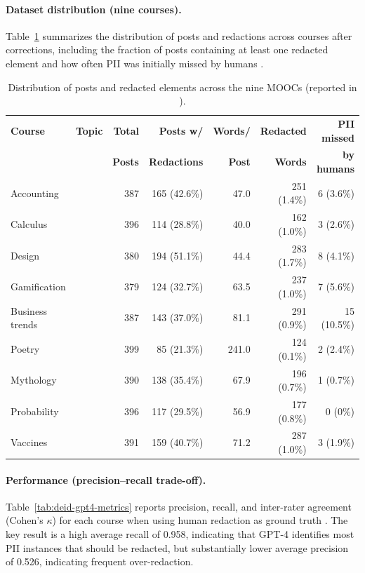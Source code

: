 \paragraph{Dataset distribution (nine courses).}
Table~\ref{tab:deid-gpt4-dist} summarizes the distribution of posts and redactions across courses
after corrections, including the fraction of posts containing at least one redacted element and how often
PII was initially missed by humans \cite{singhal2024deid_gpt4}.

\begin{table}[t]
\centering
\small
\setlength{\tabcolsep}{5pt}
\renewcommand{\arraystretch}{1.08}
\begin{tabular}{@{}l l r r r r r@{}}
\toprule
\textbf{Course} & \textbf{Topic} & \textbf{Total} & \textbf{Posts w/} & \textbf{Words/} & \textbf{Redacted} & \textbf{PII missed} \\
 &  & \textbf{Posts} & \textbf{Redactions} & \textbf{Post} & \textbf{Words} & \textbf{by humans} \\
\midrule
Accounting &  & 387 & 165 (42.6\%) & 47.0  & 251 (1.4\%) & 6 (3.6\%) \\
Calculus  &  & 396 & 114 (28.8\%) & 40.0  & 162 (1.0\%) & 3 (2.6\%) \\
Design    &  & 380 & 194 (51.1\%) & 44.4  & 283 (1.7\%) & 8 (4.1\%) \\
Gamification &  & 379 & 124 (32.7\%) & 63.5 & 237 (1.0\%) & 7 (5.6\%) \\
Business trends &  & 387 & 143 (37.0\%) & 81.1 & 291 (0.9\%) & 15 (10.5\%) \\
Poetry    &  & 399 & 85 (21.3\%)  & 241.0 & 124 (0.1\%) & 2 (2.4\%) \\
Mythology &  & 390 & 138 (35.4\%) & 67.9 & 196 (0.7\%) & 1 (0.7\%) \\
Probability &  & 396 & 117 (29.5\%) & 56.9 & 177 (0.8\%) & 0 (0\%) \\
Vaccines  &  & 391 & 159 (40.7\%) & 71.2 & 287 (1.0\%) & 3 (1.9\%) \\
\bottomrule
\end{tabular}
\caption{Distribution of posts and redacted elements across the nine MOOCs (reported in \cite{singhal2024deid_gpt4}).}
\label{tab:deid-gpt4-dist}
\end{table}

\paragraph{Performance (precision--recall trade-off).}
Table~\ref{tab:deid-gpt4-metrics} reports precision, recall, and inter-rater agreement (Cohen’s $\kappa$)
for each course when using human redaction as ground truth \cite{singhal2024deid_gpt4}.
The key result is a high average recall of 0.958, indicating that GPT-4 identifies most PII instances that should
be redacted, but substantially lower average precision of 0.526, indicating frequent over-redaction.

